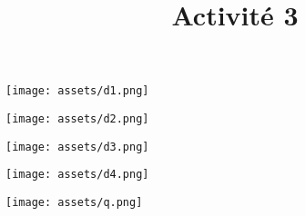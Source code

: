 \documentclass[10pt]{article}
\newcommand{\titreActivite}{Activité 3} %
\newcommand{\myscale}{0.46}
\begin{document}
\date{}
\title{\titreActivite}
\maketitle %


\begin{center}
 	\texttt{[image: assets/d1.png]}

 	\texttt{[image: assets/d2.png]}

    \texttt{[image: assets/d3.png]}

 	\texttt{[image: assets/d4.png]}

 	\texttt{[image: assets/q.png]}
\end{center}

 

\end{document}

